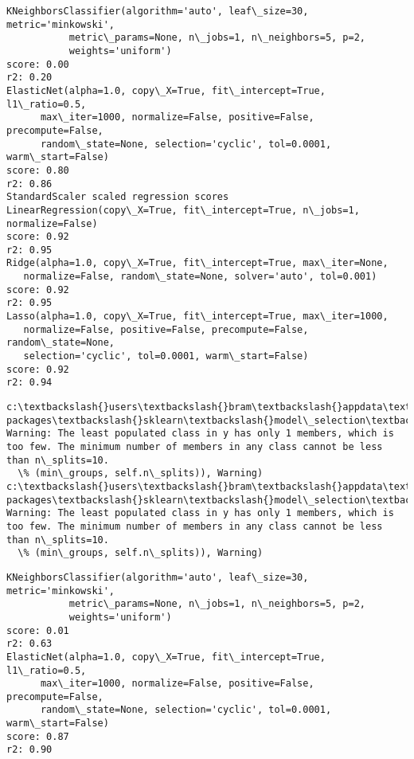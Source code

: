 \documentclass[11pt]{article}
\begin{document}
    \begin{Verbatim}[commandchars=\\\{\}]
KNeighborsClassifier(algorithm='auto', leaf\_size=30, metric='minkowski',
           metric\_params=None, n\_jobs=1, n\_neighbors=5, p=2,
           weights='uniform')
score: 0.00
r2: 0.20
ElasticNet(alpha=1.0, copy\_X=True, fit\_intercept=True, l1\_ratio=0.5,
      max\_iter=1000, normalize=False, positive=False, precompute=False,
      random\_state=None, selection='cyclic', tol=0.0001, warm\_start=False)
score: 0.80
r2: 0.86
StandardScaler scaled regression scores
LinearRegression(copy\_X=True, fit\_intercept=True, n\_jobs=1, normalize=False)
score: 0.92
r2: 0.95
Ridge(alpha=1.0, copy\_X=True, fit\_intercept=True, max\_iter=None,
   normalize=False, random\_state=None, solver='auto', tol=0.001)
score: 0.92
r2: 0.95
Lasso(alpha=1.0, copy\_X=True, fit\_intercept=True, max\_iter=1000,
   normalize=False, positive=False, precompute=False, random\_state=None,
   selection='cyclic', tol=0.0001, warm\_start=False)
score: 0.92
r2: 0.94

    \end{Verbatim}

    \begin{Verbatim}[commandchars=\\\{\}]
c:\textbackslash{}users\textbackslash{}bram\textbackslash{}appdata\textbackslash{}local\textbackslash{}programs\textbackslash{}python\textbackslash{}python36\textbackslash{}lib\textbackslash{}site-packages\textbackslash{}sklearn\textbackslash{}model\_selection\textbackslash{}\_split.py:605: Warning: The least populated class in y has only 1 members, which is too few. The minimum number of members in any class cannot be less than n\_splits=10.
  \% (min\_groups, self.n\_splits)), Warning)
c:\textbackslash{}users\textbackslash{}bram\textbackslash{}appdata\textbackslash{}local\textbackslash{}programs\textbackslash{}python\textbackslash{}python36\textbackslash{}lib\textbackslash{}site-packages\textbackslash{}sklearn\textbackslash{}model\_selection\textbackslash{}\_split.py:605: Warning: The least populated class in y has only 1 members, which is too few. The minimum number of members in any class cannot be less than n\_splits=10.
  \% (min\_groups, self.n\_splits)), Warning)

    \end{Verbatim}

    \begin{Verbatim}[commandchars=\\\{\}]
KNeighborsClassifier(algorithm='auto', leaf\_size=30, metric='minkowski',
           metric\_params=None, n\_jobs=1, n\_neighbors=5, p=2,
           weights='uniform')
score: 0.01
r2: 0.63
ElasticNet(alpha=1.0, copy\_X=True, fit\_intercept=True, l1\_ratio=0.5,
      max\_iter=1000, normalize=False, positive=False, precompute=False,
      random\_state=None, selection='cyclic', tol=0.0001, warm\_start=False)
score: 0.87
r2: 0.90

    \end{Verbatim}
\end{document}
